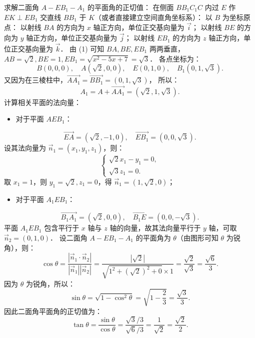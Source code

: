 \begin{answer}
求解二面角 $A - EB_1 - A_1$ 的平面角的正切值：
在侧面 $BB_1C_1C$ 内过 $E$ 作 $EK \perp EB_1$ 交直线 $BB_1$ 于 $K$（或者直接建立空间直角坐标系）：
以 $B$ 为坐标原点：
以射线 $BA$ 的方向为 $x$ 轴正方向，单位正交基向量为 $\vec{i}$；
以射线 $BE$ 的方向为 $y$ 轴正方向，单位正交基向量为 $\vec{j}$；
以射线 $EB_1$ 的方向为 $z$ 轴正方向，单位正交基向量为 $\vec{k}$．
由 (1) 可知 $BA, BE, EB_1$ 两两垂直，$AB = \sqrt{2}, BE = 1, EB_1 = \sqrt{x^2 - 5x + 7} = \sqrt{3}$．
各点坐标为：
\nopagebreak[4]
\[
B(0, 0, 0), \quad A(\sqrt{2}, 0, 0), \quad E(0, 1, 0), \quad B_1(0, 1, \sqrt{3}).
\]
又因为在三棱柱中，$\overrightarrow{AA_1} = \overrightarrow{BB_1} = (0, 1, \sqrt{3})$，
所以：
\nopagebreak[4]
\[
A_1 = A + \overrightarrow{AA_1} = (\sqrt{2}, 1, \sqrt{3}).
\]
计算相关平面的法向量：
\begin{itemize}
\item 对于平面 $AEB_1$：
\end{itemize}
\nopagebreak[4]
\[
\overrightarrow{EA} = (\sqrt{2}, -1, 0), \quad \overrightarrow{EB_1} = (0, 0, \sqrt{3}).
\]
设其法向量为 $\vec{n}_1 = (x_1, y_1, z_1)$，则：
\nopagebreak[4]
\[
\begin{cases}
\sqrt{2}x_1 - y_1 = 0, \\
\sqrt{3}z_1 = 0.
\end{cases}
\]
取 $x_1 = 1$，则 $y_1 = \sqrt{2}, z_1 = 0$，得 $\vec{n}_1 = (1, \sqrt{2}, 0)$；
\begin{itemize}
\item 对于平面 $A_1EB_1$：
\end{itemize}
\nopagebreak[4]
\[
\overrightarrow{B_1A_1} = (\sqrt{2}, 0, 0), \quad \overrightarrow{B_1E} = (0, 0, -\sqrt{3}).
\]
平面 $A_1EB_1$ 包含平行于 $x$ 轴与 $z$ 轴的向量，故其法向量平行于 $y$ 轴，可取 $\vec{n}_2 = (0, 1, 0)$．
设二面角 $A - EB_1 - A_1$ 的平面角为 $\theta$（由图形可知 $\theta$ 为锐角），则：
\nopagebreak[4]
\[
\cos\theta = \frac{|\vec{n}_1 \cdot \vec{n}_2|}{|\vec{n}_1| |\vec{n}_2|} = \frac{|\sqrt{2}|}{\sqrt{1^2 + (\sqrt{2})^2 + 0} \times 1} = \frac{\sqrt{2}}{\sqrt{3}} = \frac{\sqrt{6}}{3}.
\]
因为 $\theta$ 为锐角，所以：
\nopagebreak[4]
\[
\sin\theta = \sqrt{1 - \cos^2\theta} = \sqrt{1 - \frac{2}{3}} = \frac{\sqrt{3}}{3}.
\]
因此二面角平面角的正切值为：
\nopagebreak[4]
\[
\tan\theta = \frac{\sin\theta}{\cos\theta} = \frac{\sqrt{3}/3}{\sqrt{6}/3} = \frac{1}{\sqrt{2}} = \frac{\sqrt{2}}{2}.
\]



\end{answer}
